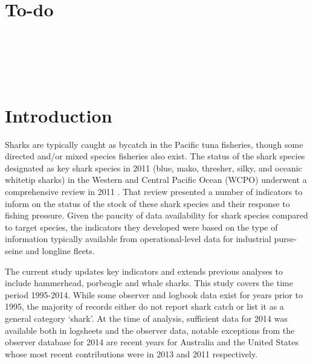 \documentclass[12pt]{SCreport}
\begin{document}
\wcpfctitlepage

\tableofcontents

\section*{To-do}

\\
\\
\\
\\

\section{Introduction} %


Sharks are typically caught as bycatch in the Pacific tuna fisheries, though some directed and/or mixed species fisheries also exist. The status of the shark species designated as key shark species in 2011 (blue, mako, thresher, silky, and oceanic whitetip sharks) in the Western and Central Pacific Ocean (WCPO)  underwent a comprehensive review in 2011 \citep{Clarke2011_a}. That review presented a number of indicators to inform on the status of the stock of these shark species and their response to fishing pressure. Given the paucity of data availability for shark species compared to target species, the indicators they developed were based on the type of information typically available from operational-level data for industrial purse-seine and longline fleets. 

The current study updates key indicators and extends previous analyses to include hammerhead, porbeagle and whale sharks. This study covers the time period 1995-2014. While some observer and logbook data exist for years prior to 1995, the majority of records either do not report shark catch or list it as a general category `shark'.  At the time of analysis, sufficient data for 2014 was available both in logsheets and the observer data, notable exceptions from the observer database for 2014 are recent years for Australia and the United States whose most recent contributions were in 2013 and 2011 respectively.
\end{document}
